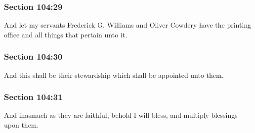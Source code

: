	\subsubsection{Section 104:29} %
		\label{DC104-29}

		And let my servants Frederick G. Williams and Oliver Cowdery have the printing office and all things that pertain unto it.


	\subsubsection{Section 104:30} %
		\label{DC104-30}

		And this shall be their stewardship which shall be appointed unto them.


	\subsubsection{Section 104:31} %
		\label{DC104-31}

		And inasmuch as they are faithful, behold I will bless, and multiply blessings upon them.


